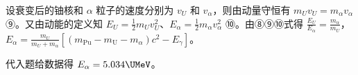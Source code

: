 \documentclass[\gkver]{gaokaozhenti}
\begin{document}
\begin{enumerate}
{设衰变后的铀核和 $\alpha$ 粒子的速度分别为 $v_{U}$ 和 $v_{\alpha}$，则由动量守恒有 $m_{U}v_{U}=m_{\alpha}v_{\alpha}$ ⑨。又由动能的定义知 $E_{U}=\frac{1}{2}m_{U}v_{U}^{2}$、$E_{\alpha}=\frac{1}{2}m_{\alpha}v_{\alpha}^{2}$ ⑩。由⑧⑨⑩式得 $\frac{E_{U}}{E_{\alpha}}=\frac{m_{\alpha}}{m_{U}}$，$E_{\alpha}=\frac{m_{U}}{m_{U}+m_{\alpha}}\left[(m_{\mathrm{Pu}}-m_{\mathrm{U}}-m_{\alpha})c^{2}-E_{\gamma}\right]$。

代入题给数据得 $E_{\alpha}=5.034\UMeV$。
}

\end{enumerate}
\end{document}
